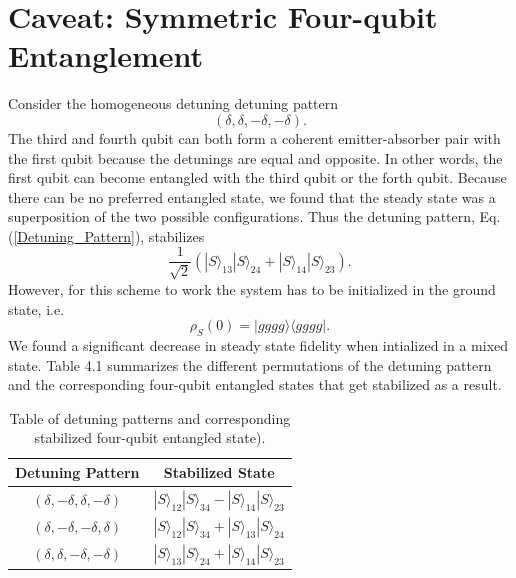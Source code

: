 \section{Caveat: Symmetric Four-qubit Entanglement}
%
Consider the homogeneous detuning detuning pattern
\begin{equation}\label{Detuning_Pattern}
 ( \delta ,  \delta , -\delta , - \delta  ).
\end{equation}
The third and fourth qubit can both form a coherent emitter-absorber pair with the first qubit because the detunings are equal and opposite. In other words, the first qubit can become entangled with the third qubit or the forth qubit. Because there can be no preferred entangled state, we found that the steady state was a superposition of the two possible configurations. Thus the detuning pattern, Eq. (\ref{Detuning_Pattern}), stabilizes
\begin{equation}
 \frac{1}{\sqrt{2}}\left( | S \rangle_{13} | S \rangle_{24} + | S \rangle_{14} | S \rangle_{23} \right).
\end{equation}
However, for this scheme to work the system has to be initialized in the ground state,  i.e.
\begin{equation}
    \rho_S(0) = | gggg \rangle \langle gggg |.
\end{equation}
We found a significant decrease in steady state fidelity when intialized in a mixed state. Table 4.1 summarizes the different permutations of the detuning pattern and the corresponding four-qubit entangled states that get stabilized as a result.
%
\begin{table}[t!]\label{Bell State Table}
\centering
\begin{tabular}{c|c}
\centering
Detuning Pattern & Stabilized State \\
\hline
$( \delta , - \delta , \delta , - \delta  )$ & $| S \rangle_{12} | S \rangle_{34} - | S \rangle_{14} | S \rangle_{23}$  \\
$( \delta , - \delta , -\delta ,  \delta  )$ & $ | S \rangle_{12} | S \rangle_{34} + | S \rangle_{13} | S \rangle_{24}$  \\
$( \delta , \delta , - \delta , - \delta  )$  & $ | S \rangle_{13} | S \rangle_{24} + | S \rangle_{14} | S \rangle_{23}$ 
\end{tabular}
\caption{Table of detuning patterns and corresponding stabilized four-qubit entangled state).}
\end{table}
%
